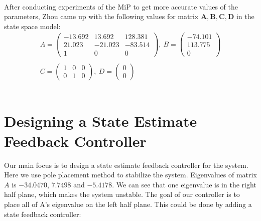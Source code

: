 \documentclass{article}
\begin{document}
\paragraph{}
After conducting experiments of the MiP to get more accurate values of the parameters, Zhou came up with the following values for matrix $\boldsymbol{A,B,C,D}$ in the state space model:
\begin{equation}
\begin{gathered}
A=
\begin{pmatrix}
-13.692 & 13.692 & 128.381\\
21.023 & -21.023 & -83.514\\
1 & 0 & 0
\end{pmatrix}
,\
B=
\begin{pmatrix}
-74.101\\
113.775\\
0
\end{pmatrix}
\\
\\
C=
\begin{pmatrix}
1 & 0 & 0 \\
0 & 1 & 0
\end{pmatrix}
,\
D=
\begin{pmatrix}
0\\
0
\end{pmatrix}
\end{gathered}
\end{equation}
\\
\section{Designing a State Estimate Feedback Controller}
Our main focus is to design a state estimate feedback controller for the system. Here we use pole placement method to stabilize the system. Eigenvalues of matrix $A$ is $-34.0470$, $7.7498$ and $-5.4178$. We can see that one eigenvalue is in the right half plane, which makes the system unstable. The goal of our controller is to place all of A's eigenvalue on the left half plane. This could be done by adding a state feedback controller: 
\end{document}
